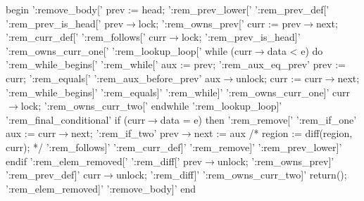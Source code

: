                   begin   
':remove\_body['         prev   :=   head;   
':rem\_prev\_lower['   
':rem\_prev\_def['   
':rem\_prev\_is\_head['  prev$\rightarrow$lock;   
':rem\_owns\_prev['      curr   :=   prev$\rightarrow$next;   
':rem\_curr\_def['   
':rem\_follows['         curr$\rightarrow$lock;   
':rem\_prev\_is\_head]'   
':rem\_owns\_curr\_one['   
':rem\_lookup\_loop['    while   (curr$\rightarrow$data   <   e)   do   
':rem\_while\_begins['   
':rem\_while['               aux   :=   prev;   
':rem\_aux\_eq\_prev'        prev   :=   curr;   
':rem\_equals['   
':rem\_aux\_before\_prev'    aux$\rightarrow$unlock; 
                             curr   :=   curr$\rightarrow$next;   
':rem\_while\_begins]'   
':rem\_equals]'   
':rem\_while]'   
':rem\_owns\_curr\_one]'     curr$\rightarrow$lock;   
':rem\_owns\_curr\_two['   endwhile   
':rem\_lookup\_loop]'   
':rem\_final\_conditional' if   (curr$\rightarrow$data   =   e)   then   
':rem\_remove['   
':rem\_if\_one'               aux   :=   curr$\rightarrow$next;   
':rem\_if\_two'               prev$\rightarrow$next   :=   aux   
                        /*
                                  region   :=   diff(region,   {curr});   
                        */
':rem\_follows]'   
':rem\_curr\_def]'   
':rem\_remove]'   
':rem\_prev\_lower]'       endif   
':rem\_elem\_removed['   
':rem\_diff['              prev$\rightarrow$unlock;   
':rem\_owns\_prev]'   
':rem\_prev\_def]'         curr$\rightarrow$unlock;   
':rem\_diff]'   
':rem\_owns\_curr\_two]'   return();   
':rem\_elem\_removed]'   
':remove\_body]'       end   
                        